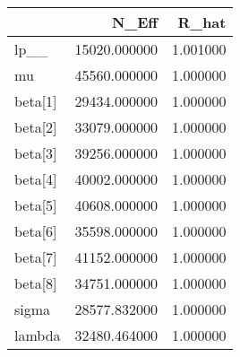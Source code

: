 \begin{tabular}{lrr}
\toprule
 & N_Eff & R_hat \\
\midrule
lp__ & 15020.000000 & 1.001000 \\
mu & 45560.000000 & 1.000000 \\
beta[1] & 29434.000000 & 1.000000 \\
beta[2] & 33079.000000 & 1.000000 \\
beta[3] & 39256.000000 & 1.000000 \\
beta[4] & 40002.000000 & 1.000000 \\
beta[5] & 40608.000000 & 1.000000 \\
beta[6] & 35598.000000 & 1.000000 \\
beta[7] & 41152.000000 & 1.000000 \\
beta[8] & 34751.000000 & 1.000000 \\
sigma & 28577.832000 & 1.000000 \\
lambda & 32480.464000 & 1.000000 \\
\bottomrule
\end{tabular}
